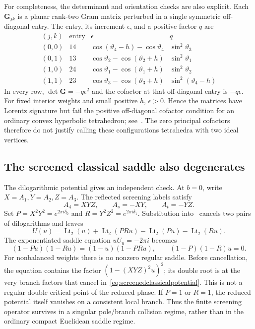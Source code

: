 For completeness, the determinant and orientation checks are
also explicit. Each $\mathbf G_{jk}$ is a planar rank-two
Gram matrix perturbed in a single symmetric off-diagonal entry.
The entry, its increment $\epsilon$, and a positive factor $q$
are
\[
\begin{array}{c|c|c|c}
(j,k)&\text{entry}&\epsilon&q\\ \hline
(0,0)&14&\cos(\vartheta_4-h)-\cos\vartheta_4&
                                      \sin^2\vartheta_3\\
(0,1)&13&\cos\vartheta_2-\cos(\vartheta_2+h)&
                                      \sin^2\vartheta_1\\
(1,0)&24&\cos\vartheta_1-\cos(\vartheta_1+h)&
                                      \sin^2\vartheta_2\\
(1,1)&23&\cos\vartheta_3-\cos(\vartheta_3+h)&
                                      \sin^2(\vartheta_4-h)
\end{array}
\]
In every row, $\det\mathbf G=-q\epsilon^2$ and the cofactor
at that off-diagonal entry is $-q\epsilon$. For fixed interior
weights and small positive $h$, $\epsilon>0$. Hence the matrices
have Lorentz signature but fail the positive off-diagonal
cofactor condition for an ordinary convex hyperbolic
tetrahedron; see~\cite[Theorem~2.1]{BellettiYang}.
The zero principal cofactors therefore do not justify calling
these configurations tetrahedra with two ideal vertices.

\subsection{The screened classical saddle also degenerates}

The dilogarithmic potential gives an independent check. At
$b=0$, write $X=A_1,Y=A_2,Z=A_3$. The reflected screening
labels satisfy
\[
 A_4=XYZ,\qquad A_s=-XY,\qquad A_t=-YZ.
\]
Set
$P=X^2Y^2=e^{2\pi i\delta_0}$ and
$R=Y^2Z^2=e^{2\pi i\delta_1}$.
Substitution into~\cite[eq.~(3.1)]{TeschnerVartanov} cancels
two pairs of dilogarithms and leaves
\begin{equation}
 U(u)=\operatorname{Li}_2(u)+\operatorname{Li}_2(PRu)
       -\operatorname{Li}_2(Pu)-\operatorname{Li}_2(Ru).
 \label{eq:screenedclassicalpotential}
\end{equation}
The exponentiated saddle equation $uU_u=-2\pi i$ becomes
\[
 (1-Pu)(1-Ru)=(1-u)(1-PRu),
 \qquad (1-P)(1-R)u=0.
\]
For nonbalanced weights there is no nonzero regular saddle.
Before cancellation, the equation contains the factor
$(1-(XYZ)^2u)^2$; its double root is at the very branch
factors that cancel in~\eqref{eq:screenedclassicalpotential}.
This is not a regular double critical point of the reduced
phase. If $P=1$ or $R=1$, the reduced potential itself vanishes
on a consistent local branch. Thus the finite screening
operator survives in a singular pole/branch collision regime,
rather than in the ordinary compact Euclidean saddle regime.

